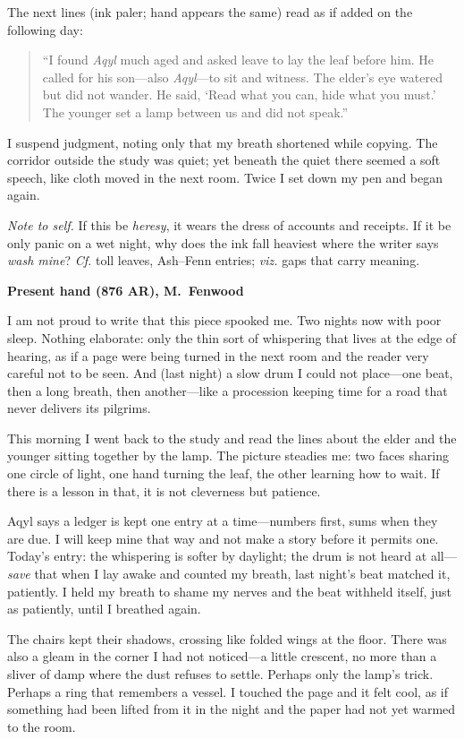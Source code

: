 \documentclass[11pt]{article}
\numberwithin{equation}{section} %
\theoremstyle{plain} %
\theoremstyle{definition} %
\theoremstyle{remark} %
\begin{document}
The next lines (ink paler; hand appears the same) read as if added on the following day:

\begin{quote}\small
“I found \textit{Aqyl} much aged and asked leave to lay the leaf before him. He called for his son—also \textit{Aqyl}—to sit and witness. The elder’s eye watered but did not wander. He said, ‘Read what you can, hide what you must.’ The younger set a lamp between us and did not speak.”
\end{quote}

I suspend judgment, noting only that my breath shortened while copying. The corridor outside the study was quiet; yet beneath the quiet there seemed a soft speech, like cloth moved in the next room. Twice I set down my pen and began again.

\medskip
\noindent\textit{Note to self.} If this be \emph{heresy}, it wears the dress of accounts and receipts. If it be only panic on a wet night, why does the ink fall heaviest where the writer says \emph{wash mine}? \emph{Cf.} toll leaves, Ash–Fenn entries; \emph{viz.} gaps that carry meaning.

\medskip
\noindent\textbf{Present hand (876 AR), M.\ Fenwood}

I am not proud to write that this piece spooked me. Two nights now with poor sleep. Nothing elaborate: only the thin sort of whispering that lives at the edge of hearing, as if a page were being turned in the next room and the reader very careful not to be seen. And (last night) a slow drum I could not place—one beat, then a long breath, then another—like a procession keeping time for a road that never delivers its pilgrims.

This morning I went back to the study and read the lines about the elder and the younger sitting together by the lamp. The picture steadies me: two faces sharing one circle of light, one hand turning the leaf, the other learning how to wait. If there is a lesson in that, it is not cleverness but patience.

Aqyl says a ledger is kept one entry at a time—numbers first, sums when they are due. I will keep mine that way and not make a story before it permits one. Today’s entry: the whispering is softer by daylight; the drum is not heard at all—\emph{save} that when I lay awake and counted my breath, last night’s beat matched it, patiently. I held my breath to shame my nerves and the beat withheld itself, just as patiently, until I breathed again.

The chairs kept their shadows, crossing like folded wings at the floor. There was also a gleam in the corner I had not noticed—a little crescent, no more than a sliver of damp where the dust refuses to settle. Perhaps only the lamp’s trick. Perhaps a ring that remembers a vessel. I touched the page and it felt cool, as if something had been lifted from it in the night and the paper had not yet warmed to the room.
\end{document}
